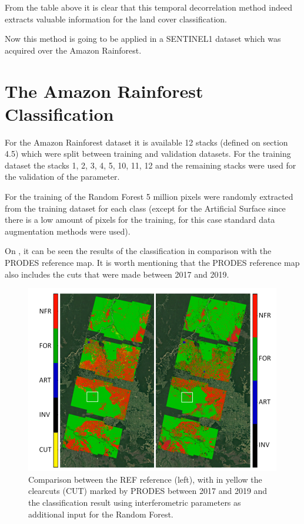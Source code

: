 From the table above it is clear that this temporal decorrelation method indeed extracts valuable information for the land cover classification.

Now this method is going to be applied in a SENTINEL1 dataset which was acquired over the Amazon Rainforest.

\section{The Amazon Rainforest Classification}
For the Amazon Rainforest dataset it is available 12 stacks (defined on section 4.5) which were split between training and validation datasets. For the training dataset the stacks 1, 2, 3, 4, 5, 10, 11, 12 and the remaining stacks were used for the validation of the parameter. 

For the training of the Random Forest 5 million pixels were randomly extracted from the training dataset for each class (except for the Artificial Surface since there is a low amount of pixels for the training, for this case standard data augmentation methods were used). 

On , it can be seen the results of the classification in comparison with the PRODES reference map. It is worth mentioning that the PRODES reference map also includes the cuts that were made between 2017 and 2019.

\begin{figure}[H]
    \centering
    \includegraphics{Cap4/classificacaoamazon.png}
    \caption{Comparison between the REF reference (left), with in yellow the clearcuts (CUT) marked by
PRODES between 2017 and 2019 and the classification result using interferometric parameters as additional input for the Random Forest.}
    \label{fig:results_rondonia}
\end{figure}

